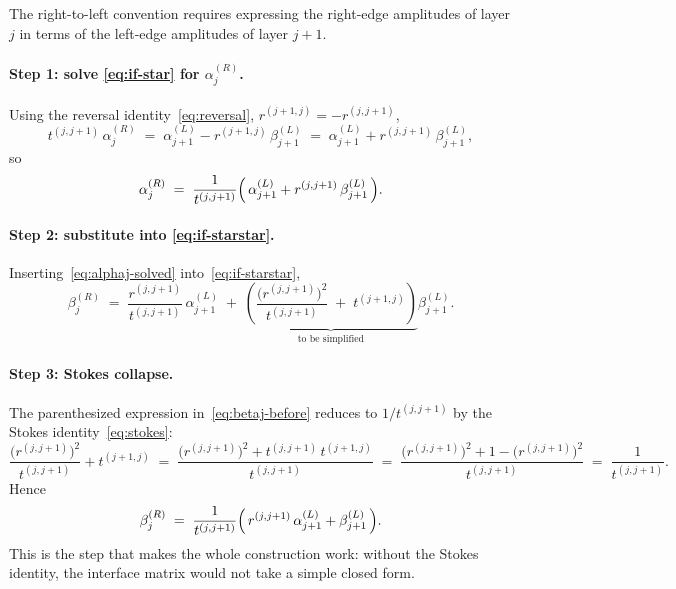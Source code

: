 \documentclass[aps,prb,onecolumn,superscriptaddress,nofootinbib,11pt]{revtex4-2}
\begin{document}
The right-to-left convention requires expressing the right-edge amplitudes of layer $j$ in terms of the left-edge amplitudes of layer $j{+}1$.

\paragraph{Step 1: solve \eqref{eq:if-star} for $\alpha_j^{(R)}$.}
Using the reversal identity~\eqref{eq:reversal}, $r^{(j+1,j)} = -r^{(j,j+1)}$,
\begin{equation}
  t^{(j,j+1)}\,\alpha_j^{(R)} \;=\; \alpha_{j+1}^{(L)} - r^{(j+1,j)}\,\beta_{j+1}^{(L)} \;=\; \alpha_{j+1}^{(L)} + r^{(j,j+1)}\,\beta_{j+1}^{(L)},
\end{equation}
so
\begin{equation}
  \alpha_j^{(R)} \;=\; \frac{1}{t^{(j,j+1)}} \Bigl(\, \alpha_{j+1}^{(L)} + r^{(j,j+1)}\, \beta_{j+1}^{(L)} \,\Bigr).
  \label{eq:alphaj-solved}
\end{equation}

\paragraph{Step 2: substitute into \eqref{eq:if-starstar}.}
Inserting~\eqref{eq:alphaj-solved} into~\eqref{eq:if-starstar},
\begin{equation}
  \beta_j^{(R)} \;=\; \frac{r^{(j,j+1)}}{t^{(j,j+1)}}\, \alpha_{j+1}^{(L)}
  \;+\;
  \underbrace{
    \left(
      \frac{\bigl(r^{(j,j+1)}\bigr)^{2}}{t^{(j,j+1)}} \;+\; t^{(j+1,j)}
    \right)
  }_{\displaystyle \text{to be simplified}}
  \beta_{j+1}^{(L)}.
  \label{eq:betaj-before}
\end{equation}

\paragraph{Step 3: Stokes collapse.}
The parenthesized expression in~\eqref{eq:betaj-before} reduces to $1/t^{(j,j+1)}$ by the Stokes identity~\eqref{eq:stokes}:
\begin{equation}
  \frac{\bigl(r^{(j,j+1)}\bigr)^{2}}{t^{(j,j+1)}} + t^{(j+1,j)}
  \;=\; \frac{\bigl(r^{(j,j+1)}\bigr)^{2} + t^{(j,j+1)}\, t^{(j+1,j)}}{t^{(j,j+1)}}
  \;=\; \frac{\bigl(r^{(j,j+1)}\bigr)^{2} + 1 - \bigl(r^{(j,j+1)}\bigr)^{2}}{t^{(j,j+1)}}
  \;=\; \frac{1}{t^{(j,j+1)}}.
  \label{eq:stokes-collapse}
\end{equation}
Hence
\begin{equation}
  \beta_j^{(R)} \;=\; \frac{1}{t^{(j,j+1)}} \Bigl(\, r^{(j,j+1)}\, \alpha_{j+1}^{(L)} + \beta_{j+1}^{(L)} \,\Bigr).
  \label{eq:betaj-solved}
\end{equation}
This is the step that makes the whole construction work: without the Stokes identity, the interface matrix would not take a simple closed form.
\end{document}
